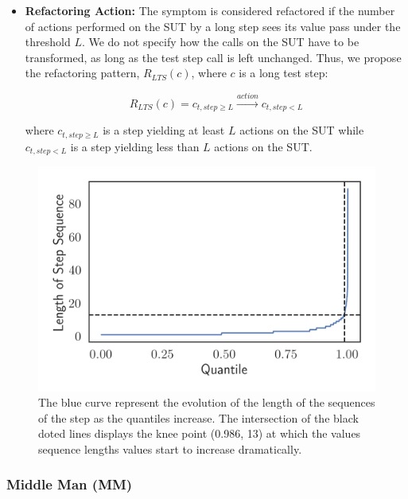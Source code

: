 \begin{itemize}
    \item \textbf{Refactoring Action:} The symptom is considered refactored if the number of actions performed on the SUT by a long step sees its value pass under the threshold $L$. We do not specify how the calls on the SUT have to be transformed, as long as the test step call is left unchanged. Thus, we propose the refactoring pattern, $R_{LTS}(c)$, where $c$ is a long test step:

    \begin{equation*}
        R_{LTS}(c) = c_{t, step\geq L} \xrightarrow{action} c_{t, step < L}
    \end{equation*}
    
    where $c_{t, step\geq L}$ is a step yielding at least $L$ actions on the SUT while $c_{t, step < L}$ is a step yielding less than $L$ actions on the SUT.

\end{itemize}

\begin{figure}
\centering
\includegraphics[width=0.6\linewidth]{figures/smells/step-sequences-quantiles.png}
\caption{The blue curve represent the evolution of the length of the sequences of the step as the quantiles increase. The intersection of the black doted lines displays the knee point (0.986, 13) at which the values sequence lengths values start to increase dramatically.}  
\label{fig:step-sequences-quantiles}
\end{figure}


\subsubsection{Middle Man (MM)}

